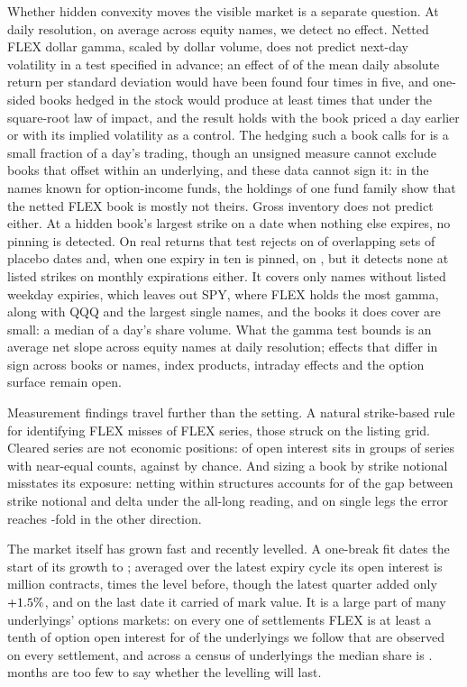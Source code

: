 \documentclass[11pt]{article}
\begin{document}
Whether hidden convexity moves the visible market is a separate question. At daily
resolution, on average across equity names, we detect no effect. Netted FLEX dollar gamma, scaled by dollar volume, does not
predict next-day volatility in a test specified in advance; an effect of
\GPredMDEShare{} of the mean daily absolute return per standard deviation would have
been found four times in five, and one-sided books hedged in the stock would produce at
least \GCalRatio{} times that under the square-root law of impact, and the result holds with the book priced a day earlier or
with its implied volatility as a control. The
hedging such a book calls for is a small fraction of a day's trading, though an unsigned
measure cannot exclude books that offset within an underlying, and these data cannot sign
it: in the names known for option-income funds, the holdings of one fund family show
that the netted FLEX book is mostly not theirs. Gross inventory does not predict either. At a hidden
book's largest strike on a date when nothing else expires, no pinning is detected. On real
returns that test rejects on \PinNullSize{} of \PinNullOffsets{} overlapping sets of
placebo dates and, when one expiry in ten is pinned, on \PinNullPowerTen{}, but it detects
none at listed strikes on monthly expirations either. It covers only names without listed
weekday expiries, which leaves out SPY, where FLEX holds the most gamma, along with QQQ and
the largest single names, and the books it
does cover are small: a median \PinMedianSize{} of a day's share volume. What the gamma
test bounds is an average net slope across equity names at daily resolution; effects that
differ in sign across books or names, index products, intraday effects and the option
surface remain open.

Measurement findings travel further than the setting. A natural strike-based rule
for identifying FLEX misses \FlexOnGridShare{} of FLEX series, those struck on the
listing grid. Cleared series are not economic positions: \PosStructuredMean{} of open
interest sits in groups of series with near-equal counts, against \PosChance{} by chance.
And sizing a book by strike notional misstates its exposure: netting within structures
accounts for \PosNettingShare{} of the gap between strike notional and delta under the
all-long reading, and on single legs the error reaches \PosDeepTimes{}-fold in the other
direction.

The market itself has grown fast and recently levelled. A one-break fit dates the start
of its growth to \BreakMonth{}; averaged over the latest expiry cycle its open interest is
\OICycleLatest{} million contracts, \GrowthMultiple{} times the level before, though the
latest quarter added only $+1.5\%$, and on the last date it carried
\ValueEnd{} of mark value. It is a large part of many underlyings' options markets: on every one
of \HiddenDailyDates{} settlements FLEX is at least a tenth of option open interest for
\HiddenStableTen{} of the \HiddenDailyComplete{} underlyings we follow that are observed
on every settlement, and across a census of \HiddenCensusUnderlyings{} underlyings the
median share is \HiddenCensusMedian{}. \PanelMonths{} months are too few to say whether the
levelling will last.
\end{document}
